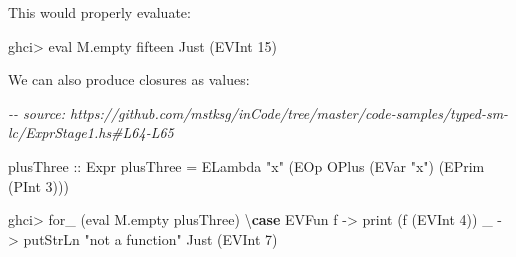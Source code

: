 \documentclass[]{article}
\newenvironment{Shaded}{}{}
\newcommand{\CommentTok}[1]{\textcolor[rgb]{0.38,0.63,0.69}{\textit{#1}}}
\newcommand{\DataTypeTok}[1]{\textcolor[rgb]{0.56,0.13,0.00}{#1}}
\newcommand{\DecValTok}[1]{\textcolor[rgb]{0.25,0.63,0.44}{#1}}
\newcommand{\FunctionTok}[1]{\textcolor[rgb]{0.02,0.16,0.49}{#1}}
\newcommand{\KeywordTok}[1]{\textcolor[rgb]{0.00,0.44,0.13}{\textbf{#1}}}
\newcommand{\NormalTok}[1]{#1}
\newcommand{\OperatorTok}[1]{\textcolor[rgb]{0.40,0.40,0.40}{#1}}
\newcommand{\OtherTok}[1]{\textcolor[rgb]{0.00,0.44,0.13}{#1}}
\newcommand{\StringTok}[1]{\textcolor[rgb]{0.25,0.44,0.63}{#1}}
\begin{document}
\begin{Shaded}
\end{Shaded}

This would properly evaluate:

\begin{Shaded}
\begin{Highlighting}[]
\NormalTok{ghci}\OperatorTok{\textgreater{}}\NormalTok{ eval M.empty fifteen}
\DataTypeTok{Just}\NormalTok{ (}\DataTypeTok{EVInt} \DecValTok{15}\NormalTok{)}
\end{Highlighting}
\end{Shaded}

We can also produce closures as values:

\begin{Shaded}
\begin{Highlighting}[]
\CommentTok{{-}{-} source: https://github.com/mstksg/inCode/tree/master/code{-}samples/typed{-}sm{-}lc/ExprStage1.hs\#L64{-}L65}

\OtherTok{plusThree ::} \DataTypeTok{Expr}
\NormalTok{plusThree }\OtherTok{=} \DataTypeTok{ELambda} \StringTok{"x"}\NormalTok{ (}\DataTypeTok{EOp} \DataTypeTok{OPlus}\NormalTok{ (}\DataTypeTok{EVar} \StringTok{"x"}\NormalTok{) (}\DataTypeTok{EPrim}\NormalTok{ (}\DataTypeTok{PInt} \DecValTok{3}\NormalTok{)))}
\end{Highlighting}
\end{Shaded}

\begin{Shaded}
\begin{Highlighting}[]
\NormalTok{ghci}\OperatorTok{\textgreater{}}\NormalTok{ for\_ (eval M.empty plusThree) \textbackslash{}}\KeywordTok{case}
    \DataTypeTok{EVFun}\NormalTok{ f }\OtherTok{{-}\textgreater{}} \FunctionTok{print}\NormalTok{ (f (}\DataTypeTok{EVInt} \DecValTok{4}\NormalTok{))}
\NormalTok{    \_ }\OtherTok{{-}\textgreater{}} \FunctionTok{putStrLn} \StringTok{"not a function"}
\DataTypeTok{Just}\NormalTok{ (}\DataTypeTok{EVInt} \DecValTok{7}\NormalTok{)}
\end{Highlighting}
\end{Shaded}
\end{document}
